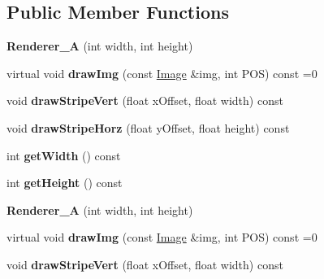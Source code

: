 \subsection*{Public Member Functions}
\begin{DoxyCompactItemize}
\item 
\hypertarget{class_renderer___a_afaef918b4d9abdb929d9a437d00e3eb8}{{\bfseries Renderer\-\_\-\-A} (int width, int height)}\label{class_renderer___a_afaef918b4d9abdb929d9a437d00e3eb8}

\item 
\hypertarget{class_renderer___a_a9702e174f4c76edd6059e3593ce03291}{virtual void {\bfseries draw\-Img} (const \hyperlink{class_image}{Image} \&img, int P\-O\-S) const =0}\label{class_renderer___a_a9702e174f4c76edd6059e3593ce03291}

\item 
\hypertarget{class_renderer___a_af817037b1ebd9906e5f4faee1637bdf0}{void {\bfseries draw\-Stripe\-Vert} (float x\-Offset, float width) const }\label{class_renderer___a_af817037b1ebd9906e5f4faee1637bdf0}

\item 
\hypertarget{class_renderer___a_a70ea4a1396787e8a3c59c848a6aeabcd}{void {\bfseries draw\-Stripe\-Horz} (float y\-Offset, float height) const }\label{class_renderer___a_a70ea4a1396787e8a3c59c848a6aeabcd}

\item 
\hypertarget{class_renderer___a_a79fb640a6c4a733647f3bc5cd96c3bad}{int {\bfseries get\-Width} () const }\label{class_renderer___a_a79fb640a6c4a733647f3bc5cd96c3bad}

\item 
\hypertarget{class_renderer___a_a69aeb74354637f5d9d7a5508f00dde33}{int {\bfseries get\-Height} () const }\label{class_renderer___a_a69aeb74354637f5d9d7a5508f00dde33}

\item 
\hypertarget{class_renderer___a_afaef918b4d9abdb929d9a437d00e3eb8}{{\bfseries Renderer\-\_\-\-A} (int width, int height)}\label{class_renderer___a_afaef918b4d9abdb929d9a437d00e3eb8}

\item 
\hypertarget{class_renderer___a_a9702e174f4c76edd6059e3593ce03291}{virtual void {\bfseries draw\-Img} (const \hyperlink{class_image}{Image} \&img, int P\-O\-S) const =0}\label{class_renderer___a_a9702e174f4c76edd6059e3593ce03291}

\item 
\hypertarget{class_renderer___a_af817037b1ebd9906e5f4faee1637bdf0}{void {\bfseries draw\-Stripe\-Vert} (float x\-Offset, float width) const }\label{class_renderer___a_af817037b1ebd9906e5f4faee1637bdf0}


\end{DoxyCompactItemize}
